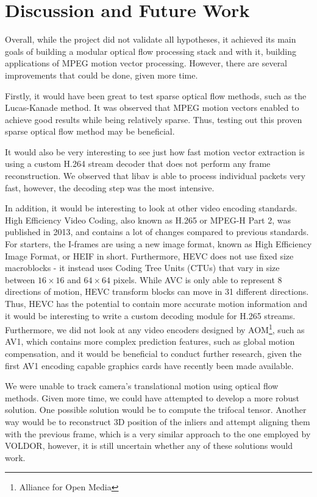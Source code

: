 \documentclass[11pt,english]{report}
\begin{document}
\section{Discussion and Future Work}

Overall, while the project did not validate all hypotheses, it achieved its main goals of building a modular optical flow processing stack and with it, building applications of MPEG motion vector processing. However, there are several improvements that could be done, given more time.

Firstly, it would have been great to test sparse optical flow methods, such as the Lucas-Kanade method\cite{lucas-kanade}. It was observed that MPEG motion vectors enabled to achieve good results while being relatively sparse. Thus, testing out this proven sparse optical flow method may be beneficial.

It would also be very interesting to see just how fast motion vector extraction is using a custom H.264 stream decoder that does not perform any frame reconstruction. We observed that libav is able to process individual packets very fast, however, the decoding step was the most intensive.

In addition, it would be interesting to look at other video encoding standards. High Efficiency Video Coding, also known as H.265 or MPEG-H Part 2, was published in 2013, and contains a lot of changes compared to previous standards. For starters, the I-frames are using a new image format, known as High Efficiency Image Format, or HEIF in short. Furthermore, HEVC does not use fixed size macroblocks - it instead uses Coding Tree Units (CTUs) that vary in size between $16 \times 16$ and $64 \times 64$ pixels\cite{h265}. While AVC is only able to represent 8 directions of motion, HEVC transform blocks can move in 31 different directions. Thus, HEVC has the potential to contain more accurate motion information and it would be interesting to write a custom decoding module for H.265 streams. Furthermore, we did not look at any video encoders designed by AOM\footnote{Alliance for Open Media}, such as AV1, which contains more complex prediction features, such as global motion compensation\cite{av1}\cite{av1_global_motion}, and it would be beneficial to conduct further research, given the first AV1 encoding capable graphics cards have recently been made available.

We were unable to track camera's translational motion using optical flow methods. Given more time, we could have attempted to develop a more robust solution. One possible solution would be to compute the trifocal tensor\cite{hartley_zisserman_2004}. Another way would be to reconstruct 3D position of the inliers and attempt aligning them with the previous frame, which is a very similar approach to the one employed by VOLDOR, however, it is still uncertain whether any of these solutions would work.
\end{document}
